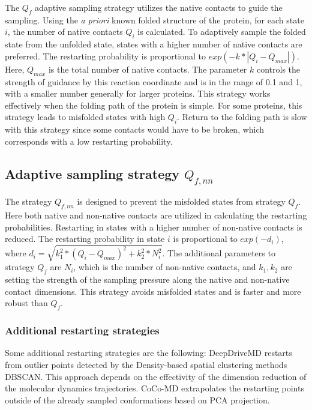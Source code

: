 The  $Q_{f}$ adaptive sampling strategy utilizes the native contacts to guide the sampling. Using the \emph{a priori} known folded structure of the protein, for each state $i$, the number of native contacts $Q_i$ is calculated. To adaptively sample the folded state from the unfolded state, states with a higher number of native contacts are preferred. The restarting probability is proportional to $exp( - k * | Q_i - Q_{max} | )$. Here, $Q_{max}$ is the total number of native contacts. The parameter $k$ controls the strength of guidance by this reaction coordinate and is in the range of 0.1 and 1, with a smaller number generally for larger proteins. This strategy works effectively when the folding path of the protein is simple. For some proteins, this strategy leads to misfolded states with high $Q_i$. Return to the folding path is slow with this strategy since some contacts would have to be broken, which corresponds with a low restarting probability.

\subsection{Adaptive sampling strategy $Q_{f,nn}$}

The strategy $Q_{f, nn}$ is designed to prevent the misfolded states from strategy $Q_{f}$.
Here both native and non-native contacts are utilized in calculating the restarting probabilities. Restarting in states with a higher number of non-native contacts is reduced.
The restarting probability in state $i$ is proportional to $exp(-d_i)$, where $d_i = \sqrt{k_1^2 * (Q_i - Q_{max})^2  + k_2^2 * N_i^2}$. 
The additional parameters to strategy $Q_{f}$ are $N_i$, which is the number of
non-native contacts, and $k_1, k_2$ are setting the strength of the sampling pressure along the native and non-native contact dimensions. This strategy avoids misfolded states and is faster and more robust than $Q_{f}$.

\subsubsection{Additional restarting strategies}
Some additional restarting strategies are the following:
DeepDriveMD\cite{leeDeepDriveMDDeepLearningDriven2019} restarts from outlier points detected by the Density-based spatial clustering methods DBSCAN. This approach depends on the effectivity of the dimension reduction of the molecular dynamics trajectories. CoCo-MD extrapolates the restarting points outside of the already sampled conformations based on PCA projection\cite{shkurti2019jctc,harada2015jctc,harada2017jctc}.  

